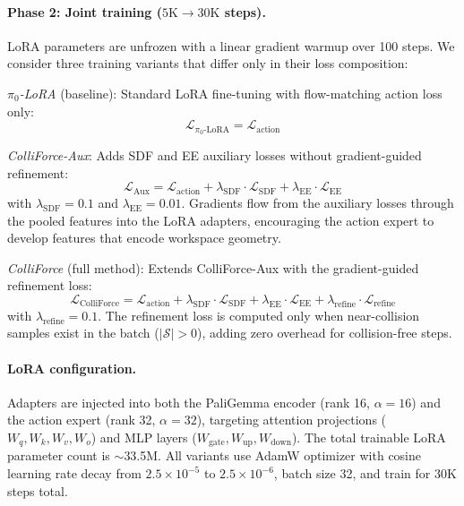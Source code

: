 \paragraph{Phase 2: Joint training ($5\mathrm{K} \to 30\mathrm{K}$ steps).} LoRA parameters are unfrozen with a linear gradient warmup over 100 steps. We consider three training variants that differ only in their loss composition:

\textit{$\pi_0$-LoRA} (baseline): Standard LoRA fine-tuning with flow-matching action loss only:
\begin{equation}
\mathcal{L}_{\pi_0\text{-LoRA}} = \mathcal{L}_\mathrm{action}
\end{equation}

\textit{ColliForce-Aux}: Adds SDF and EE auxiliary losses without gradient-guided refinement:
\begin{equation}\label{eq:loss_aux}
\mathcal{L}_\mathrm{Aux} = \mathcal{L}_\mathrm{action} + \lambda_\mathrm{SDF} \cdot \mathcal{L}_\mathrm{SDF} + \lambda_\mathrm{EE} \cdot \mathcal{L}_\mathrm{EE}
\end{equation}
with $\lambda_\mathrm{SDF} = 0.1$ and $\lambda_\mathrm{EE} = 0.01$. Gradients flow from the auxiliary losses through the pooled features into the LoRA adapters, encouraging the action expert to develop features that encode workspace geometry.

\textit{ColliForce} (full method): Extends ColliForce-Aux with the gradient-guided refinement loss:
\begin{equation}\label{eq:loss_full}
\mathcal{L}_\mathrm{ColliForce} = \mathcal{L}_\mathrm{action} + \lambda_\mathrm{SDF} \cdot \mathcal{L}_\mathrm{SDF} + \lambda_\mathrm{EE} \cdot \mathcal{L}_\mathrm{EE} + \lambda_\mathrm{refine} \cdot \mathcal{L}_\mathrm{refine}
\end{equation}
with $\lambda_\mathrm{refine} = 0.1$. The refinement loss is computed only when near-collision samples exist in the batch ($|\mathcal{S}| > 0$), adding zero overhead for collision-free steps.

\paragraph{LoRA configuration.} Adapters are injected into both the PaliGemma encoder (rank 16, $\alpha = 16$) and the action expert (rank 32, $\alpha = 32$), targeting attention projections ($W_q, W_k, W_v, W_o$) and MLP layers ($W_\mathrm{gate}, W_\mathrm{up}, W_\mathrm{down}$). The total trainable LoRA parameter count is ${\sim}$33.5M. All variants use AdamW optimizer with cosine learning rate decay from $2.5 \times 10^{-5}$ to $2.5 \times 10^{-6}$, batch size 32, and train for 30K steps total.

